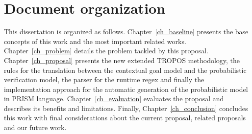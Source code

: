 \section{Document organization}

This dissertation is organized as follows. Chapter~\ref{ch_baseline} presents the base concepts of this work and the most important related works. Chapter~\ref{ch_problem} details the problem tackled by this proposal. Chapter~\ref{ch_proposal} presents the new extended TROPOS methodology, the rules for the translation between the contextual goal model and the probabilistic verification model, the parser for the runtime regex and finally the implementation approach for the automatic generation of the probabilistic model in PRISM language. Chapter~\ref{ch_evaluation} evaluates the proposal and describes its benefits and limitations. Finally, Chapter~\ref{ch_conclusion} concludes this work with final considerations about the current proposal, related proposals and our future work.